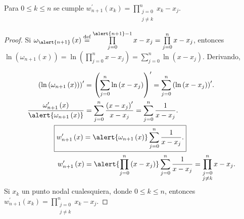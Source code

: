\begin{frame}
	\begin{theorem}
		Para $0\leq k\leq n$ se cumple
		\begin{math}
			w^{\prime}_{n+1}
			\left(x_{k}\right)=
			\prod\limits_{\substack{j=0\\j\neq k}}^{n}
			x_{k}-x_{j}.
		\end{math}
	\end{theorem}

	\begin{proof}
		Si
		\begin{math}
			\omega_{\alert{n+1}}
			\left(x\right)
			\overset{\text{def}}{=}
			\prod\limits_{j=0}^{\alert{n+1}-1}
			x-x_{j}=
			\prod\limits_{j=0}^{n}
			x-x_{j}
		\end{math}, entonces
		\begin{math}
			\ln
			\left(
			\omega_{n+1}
			\left(x\right)
			\right)=
			\ln
			\left(
			\prod\limits_{j=0}^{n}
			x-x_{j}
			\right)=
			\sum\limits_{j=0}^{n}
			\ln
			\left(
			x-x_{j}
			\right)
		\end{math}.
		Derivando,

		\begin{align*}
			{\left(
				\ln
				\left(
					\omega_{n+1}
					\left(x\right)
					\right)
			\right)}^{\prime} & =
			{\left(
			\sum\limits_{j=0}^{n}
			\ln
			\left(
				x-x_{j}
				\right)
			\right)}^{\prime}=
			\sum\limits_{j=0}^{n}
			{\left(
			\ln
			\left(
				x-x_{j}
				\right)
			\right)}^{\prime}.
			\\
			\dfrac{
				\omega^{\prime}_{n+1}\left(x\right)
			}{
				\alert{
					\omega_{n+1}\left(x\right)
				}
			}                 & =
			\sum\limits_{j=0}^{n}
			\dfrac{{\left(x-x_{j}\right)}^{\prime}}{x-x_{j}}=
			\sum\limits_{j=0}^{n}
			\dfrac{1}{x-x_{j}}.
			\\
			\Aboxed{
			w^{\prime}_{n+1}
			\left(x\right)    & =
			\alert{
				\omega_{n+1}
				\left(x\right)
			}
			\sum\limits_{j=0}^{n}
			\dfrac{1}{x-x_{j}}.
			}
			\\
			w^{\prime}_{n+1}
			\left(x\right)
			                  & =
			\alert{
				\prod\limits_{j=0}^{n}
				\left(
				x-x_{j}
				\right)
			}
			\sum\limits_{j=0}^{n}
			\dfrac{1}{x-x_{j}}=
			\prod\limits_{\substack{j=0 \\j\neq k}}^{n}
			x-x_{j}.
		\end{align*}
		Si $x_{k}$ un punto nodal cualesquiera, donde $0\leq k\leq n$,
		entonces
		\begin{math}
			w^{\prime}_{n+1}
			\left(x_{k}\right)=
			\prod\limits_{\substack{j=0 \\j\neq k}}^{n}
			x_{k}-x_{j}
		\end{math}.
	\end{proof}
\end{frame}

